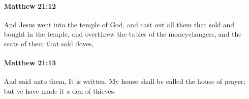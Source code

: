 		\paragraph{Matthew 21:12} %
			\label{MATTHEW-21-12}

			And Jesus went into the temple of God, and cast out all them that sold and bought in the temple, and overthrew the tables of the moneychangers, and the seats of them that sold doves,

			\begin{framed}
			\scriptsize
				\begin{compactdesc}
					\item[SBLG] 
				\end{compactdesc}
			\end{framed}

		\paragraph{Matthew 21:13} %
			\label{MATTHEW-21-13}

			And said unto them, It is written, My house shall be called the house of prayer; but ye have made it a den of thieves.

